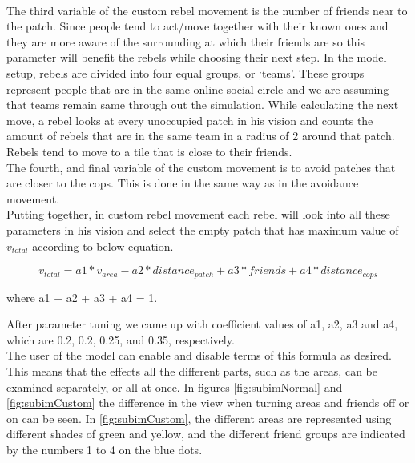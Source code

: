 \documentclass[a4paper,11pt]{article}
\begin{document}
\\
The third variable of the custom rebel movement is the number of friends near to the patch. Since people tend to act/move together with their known ones and they are more aware of the surrounding at which their friends are so this parameter will benefit the rebels while choosing their next step. In the model setup, rebels are divided into four equal groups, or `teams'. These groups represent people that are in the same online social circle and we are assuming that teams remain same through out the simulation. While calculating the next move, a rebel looks at every unoccupied patch in his vision and counts the amount of rebels that are in the same team in a radius of 2 around that patch. Rebels tend to move to a tile that is close to their friends.
\\
The fourth, and final variable of the custom movement is to avoid patches that are closer to the cops. This is done in the same way as in the avoidance movement. 
\\
Putting together, in custom rebel movement each rebel will look into all these parameters in his vision and select the empty patch that has maximum value of $v_{total}$ according to below equation.

\[v_{total} = a1 * v_{area} - a2 * distance_{patch} + a3 * friends + a4 * distance_{cops}\]
\begin{center}
where a1 + a2 + a3 + a4 = 1.
\end{center}
After parameter tuning we came up with coefficient values of a1, a2, a3 and a4, which are 0.2, 0.2, 0.25, and 0.35, respectively. 
\\
The user of the model can enable and disable terms of this formula as desired. This means that the effects all the different parts, such as the areas, can be examined separately, or all at once. In figures \ref{fig:subimNormal} and \ref{fig:subimCustom} the difference in the view when turning areas and friends off or on can be seen. In \ref{fig:subimCustom}, the different areas are represented using different shades of green and yellow, and the different friend groups are indicated by the numbers 1 to 4 on the blue dots.\\
\end{document}

